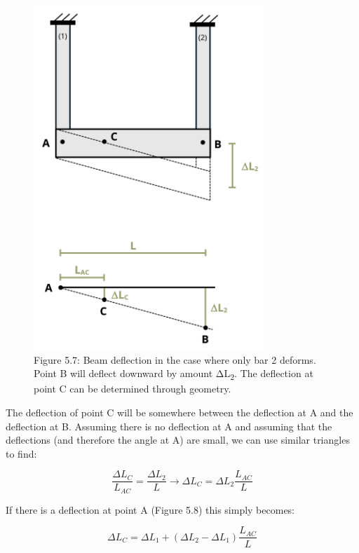 \documentclass[
  letterpaper,
  DIV=11,
  numbers=noendperiod]{scrreprt}
\begin{document}
\begin{figure}[H]

{\centering \includegraphics[width=3.42708in,height=\textheight]{images/PNGs/Figure 5.8.png}

}

\caption{Figure 5.7: Beam deflection in the case where only bar 2
deforms. Point B will deflect downward by amount ΔL\textsubscript{2}.
The deflection at point C can be determined through geometry.}

\end{figure}%

The deflection of point C will be somewhere between the deflection at A
and the deflection at B. Assuming there is no deflection at A and
assuming that the deflections (and therefore the angle at A) are small,
we can use similar triangles to find:

\[
\frac{\Delta L_C}{L_{A C}}=\frac{\Delta L_2}{L} \rightarrow \Delta L_C=\Delta L_2 \frac{L_{A C}}{L}\]

If there is a deflection at point A (Figure 5.8) this simply becomes:

\[
\Delta L_C=\Delta L_1+\left(\Delta L_2-\Delta L_1\right) \frac{L_{A C}}{L}\]
\end{document}
